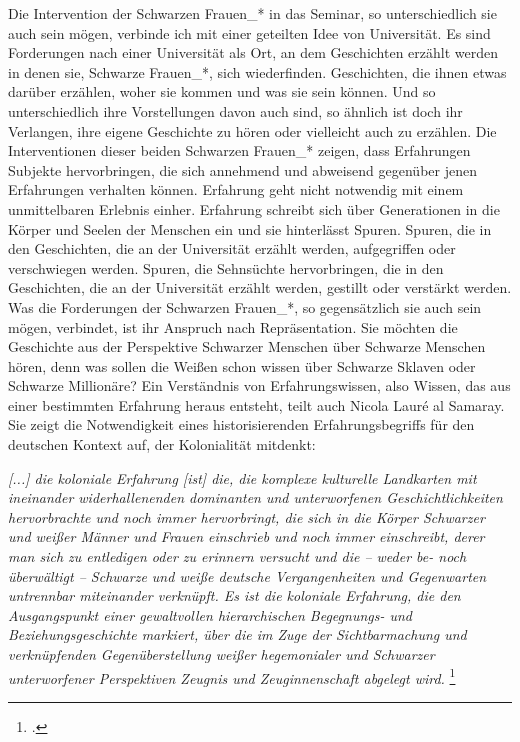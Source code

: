 Die Intervention der Schwarzen Frauen\_* in das Seminar, so unterschiedlich sie
auch sein mögen, verbinde ich mit einer geteilten Idee von Universität. Es sind
Forderungen nach einer Universität als Ort, an dem Geschichten erzählt werden in
denen sie, Schwarze Frauen\_*, sich wiederfinden. Geschichten, die ihnen etwas
darüber erzählen, woher sie kommen und was sie sein können. Und so
unterschiedlich ihre Vorstellungen davon auch sind, so ähnlich ist doch ihr
Verlangen, ihre eigene Geschichte zu hören oder vielleicht auch zu erzählen.
Die Interventionen dieser beiden Schwarzen Frauen\_* zeigen, dass Erfahrungen
Subjekte hervorbringen, die sich annehmend und abweisend gegenüber jenen
Erfahrungen verhalten können. Erfahrung geht nicht notwendig mit einem
unmittelbaren Erlebnis einher. Erfahrung schreibt sich über Generationen in die
Körper und Seelen der Menschen ein und sie hinterlässt Spuren.  Spuren, die in
den Geschichten, die an der Universität erzählt werden, aufgegriffen oder
verschwiegen werden. Spuren, die Sehnsüchte hervorbringen, die in den
Geschichten, die an der Universität erzählt werden, gestillt oder verstärkt
werden. Was die Forderungen der Schwarzen Frauen\_*, so gegensätzlich sie auch
sein mögen, verbindet, ist ihr Anspruch nach Repräsentation. Sie möchten die
Geschichte aus der Perspektive Schwarzer Menschen über Schwarze Menschen hören,
denn was sollen die Weißen schon wissen über Schwarze Sklaven oder Schwarze
Millionäre?  Ein Verständnis von Erfahrungswissen, also Wissen, das aus einer
bestimmten Erfahrung heraus entsteht, teilt auch Nicola Lauré al Samaray. Sie
zeigt die Notwendigkeit eines historisierenden Erfahrungsbegriffs für den
deutschen Kontext auf, der Kolonialität mitdenkt:

\begin{myenv} \textit{[...] die koloniale Erfahrung [ist] die, die komplexe
    kulturelle Landkarten mit ineinander widerhallenenden dominanten und
    unterworfenen Geschichtlichkeiten hervorbrachte und noch immer hervorbringt,
    die sich in die Körper Schwarzer und weißer Männer und Frauen einschrieb und
    noch immer einschreibt, derer man sich zu entledigen oder zu erinnern versucht
    und die – weder be- noch überwältigt – Schwarze und weiße deutsche
    Vergangenheiten und Gegenwarten untrennbar miteinander verknüpft. Es ist die
    koloniale Erfahrung, die den Ausgangspunkt einer gewaltvollen hierarchischen
    Begegnungs- und Beziehungsgeschichte markiert, über die im Zuge der
    Sichtbarmachung und verknüpfenden Gegenüberstellung weißer hegemonialer und
    Schwarzer unterworfener Perspektiven Zeugnis und Zeuginnenschaft abgelegt
wird.} \footnotemark \footcitetext{masken} \end{myenv}

